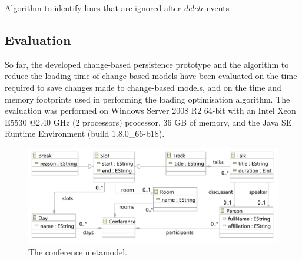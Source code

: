 \documentclass[12pt, a4paper]{report} \usepackage[titletoc]{appendix}
\begin{document}
\begin{algorithm}[H]
    \begin{small}
    \end{small}
    \caption{Algorithm to identify lines that are ignored after \emph{delete} events}
    \label{alg:create_delete_optimisation}
\end{algorithm}


\subsection{Evaluation}
\label{subsec:evaluation}
So far, the developed change-based persistence prototype and the algorithm to reduce the loading time of change-based models have been evaluated on the time required to save changes made to change-based models, and on the time and memory footprints used in performing the loading optimisation algorithm. The evaluation was performed on Windows Server 2008 R2 64-bit with an Intel Xeon E5530 @2.40 GHz (2 processors) processor, 36 GB of memory, and the Java SE Runtime Environment (build 1.8.0\_66-b18).

\begin{figure}[htbp]
	\centering
	\includegraphics[width=0.9\linewidth]{conference_metamodel}
	\caption{The conference metamodel.}   
	\label{fig:node_metamodel}
\end{figure}
\end{document}
